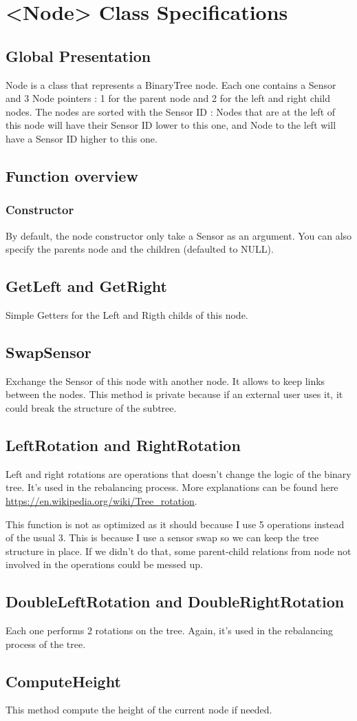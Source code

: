 \documentclass[10pt]{article}
\begin{document}
\section{<Node> Class Specifications}
\subsection{Global Presentation}


Node is a class that represents a BinaryTree node. Each one contains a Sensor and 3 Node pointers : 1 for the parent node and 2 for the left and right child nodes. The nodes are sorted with the Sensor ID : Nodes that are at the left of this node will have their Sensor ID lower to this one, and Node to the left will have a Sensor ID higher to this one.
\subsection{Function overview}
\subsubsection*{Constructor}
By default, the node constructor only take a Sensor as an argument. You can also specify the parents node and the children (defaulted to NULL).
\subsection{GetLeft and GetRight}
Simple Getters for the Left and Rigth childs of this node.
\subsection{SwapSensor}
Exchange the Sensor of this node with another node. It allows to keep links between the nodes. This method is private because if an external user uses it, it could break the structure of the subtree.

\subsection{LeftRotation and RightRotation}
Left and right rotations are operations that doesn't change the logic of the binary tree. It's used in the rebalancing process. More explanations can be found here \url{https://en.wikipedia.org/wiki/Tree_rotation}.

This function is not as optimized as it should because I use 5 operations instead of the usual 3. This is because I use a sensor swap so we can keep the tree structure in place. If we didn't do that, some parent-child relations from node not involved in the operations could be messed up.

\subsection{DoubleLeftRotation and DoubleRightRotation}
Each one performs 2 rotations on the tree. Again, it's used in the rebalancing process of the tree.

\subsection{ComputeHeight}
This method compute the height of the current node if needed.
\end{document}
